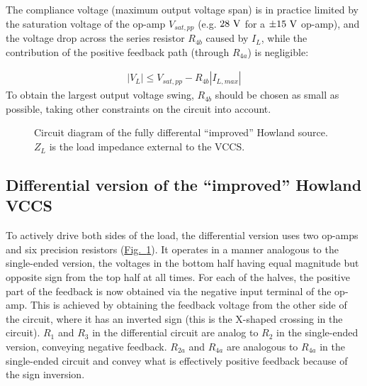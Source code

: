 \documentclass[10pt]{article}
\newcommand{\brieffiglink}[1]{\hyperref[#1]{Fig.~\ref*{#1}}}
\begin{document}
The compliance voltage (maximum output voltage span) is in practice limited by the saturation voltage of the op-amp $V_{sat,pp}$ (e.g. $28~\volt$ for a $\pm15~\volt$ op-amp), and the voltage drop across the series resistor $R_{4b}$ caused by $I_L$, while the contribution of the positive feedback path (through $R_{4a}$) is negligible:

\begin{align}
\label{eq:single_ended_compliance_voltage}
|V_L|\leq V_{sat,pp} - R_{4b}|I_{L,max}|
\end{align}
To obtain the largest output voltage swing, $R_{4b}$ should be chosen as small as possible, taking other constraints on the circuit into account.






\begin{figure}[tb]
\centering
\noindent\makebox[\textwidth]{%

}
\caption{\small Circuit diagram of the fully differental ``improved'' Howland source. $Z_L$ is the load impedance external to the VCCS.}
\label{fig:differential_howland}
\end{figure}




\subsection{Differential version of the ``improved'' Howland VCCS}
\label{sec:differential_howland}

To actively drive both sides of the load, the differential version uses two op-amps and six precision resistors (\brieffiglink{fig:differential_howland}). It operates in a manner analogous to the single-ended version, the voltages in the bottom half having equal magnitude but opposite sign from the top half at all times. For each of the halves, the positive part of the feedback is now obtained via the negative input terminal of the op-amp. This is achieved by obtaining the feedback voltage from the other side of the circuit, where it has an inverted sign (this is the X-shaped crossing in the circuit). $R_1$ and $R_3$ in the differential circuit are analog to $R_2$ in the single-ended version, conveying negative feedback. $R_{2a}$ and $R_{4a}$ are analogous to $R_{4a}$ in the single-ended circuit and convey what is effectively positive feedback because of the sign inversion.
\end{document}
